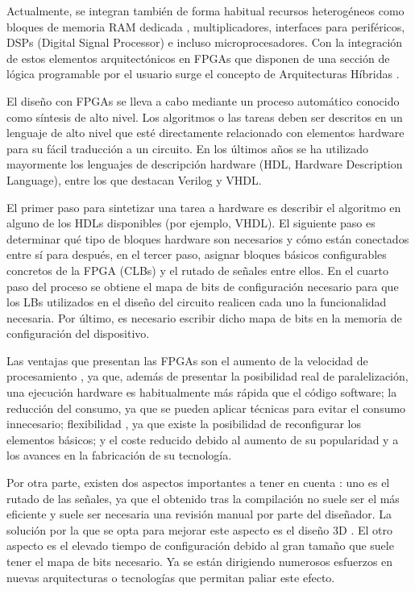 
Actualmente, se integran también de forma habitual recursos heterogéneos como bloques de memoria RAM dedicada \cite{biblio:ram_dedicada}, multiplicadores, interfaces para periféricos, DSPs (Digital Signal Processor) e incluso microprocesadores. Con la integración de estos elementos arquitectónicos en FPGAs que disponen de una sección de lógica programable por el usuario surge el concepto de Arquitecturas Híbridas \cite{biblio:bitstream}.

El diseño con FPGAs se lleva a cabo mediante un proceso automático conocido como síntesis de alto nivel. Los algoritmos o las tareas deben ser descritos en un lenguaje de alto nivel que esté directamente relacionado con elementos hardware para su fácil traducción a un circuito. En los últimos años se ha utilizado mayormente los lenguajes de descripción hardware (HDL, Hardware Description Language), entre los que destacan Verilog y VHDL.

El primer paso para sintetizar una tarea a hardware es describir el algoritmo en alguno de los HDLs disponibles (por ejemplo, VHDL). El siguiente paso es determinar qué tipo de bloques hardware son necesarios y cómo están conectados entre sí para después, en el tercer paso, asignar bloques básicos configurables concretos de la FPGA (CLBs) y el rutado de señales entre ellos. En el cuarto paso del proceso se obtiene el mapa de bits de configuración necesario para que los LBs utilizados en el diseño del circuito realicen cada uno la funcionalidad necesaria. Por último, es necesario escribir dicho mapa de bits en la memoria de configuración del dispositivo.

Las ventajas que presentan las FPGAs son el aumento de la velocidad de procesamiento \cite{biblio:TFG_Esquembri}, ya que, además de presentar la posibilidad real de paralelización, una ejecución hardware es habitualmente más rápida que el código software; la reducción del consumo, ya que se pueden aplicar técnicas para evitar el consumo innecesario; flexibilidad \cite{biblio:embedded}, ya que existe la posibilidad de reconfigurar los elementos básicos; y el coste reducido debido al aumento de su popularidad y a los avances en la fabricación de su tecnología.

Por otra parte, existen dos aspectos importantes a tener en cuenta \cite{biblio:TFG_Esquembri}: uno es el rutado de las señales, ya que el obtenido tras la compilación no suele ser el más eficiente y suele ser necesaria una revisión manual por parte del diseñador. La solución por la que se opta para mejorar este aspecto es el diseño 3D \cite{biblio:diseno3d}. El otro aspecto es el elevado tiempo de configuración debido al gran tamaño que suele tener el mapa de bits necesario. Ya se están dirigiendo numerosos esfuerzos en nuevas arquitecturas o tecnologías que permitan paliar este efecto.

